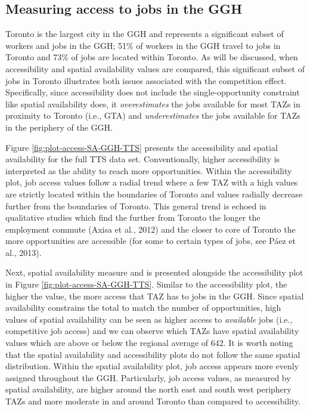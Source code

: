 \documentclass[]{elsarticle} %
\begin{document}
\hypertarget{measuring-access-to-jobs-in-the-ggh}{%
\subsection{Measuring access to jobs in the
GGH}\label{measuring-access-to-jobs-in-the-ggh}}

Toronto is the largest city in the GGH and represents a significant
subset of workers and jobs in the GGH; 51\% of workers in the GGH travel
to jobs in Toronto and 73\% of jobs are located within Toronto. As will
be discussed, when accessibility and spatial availability values are
compared, this significant subset of jobs in Toronto illustrates both
issues associated with the competition effect. Specifically, since
accessibility does not include the single-opportunity constraint like
spatial availability does, it \emph{overestimates} the jobs available
for most TAZs in proximity to Toronto (i.e., GTA) and
\emph{underestimates} the jobs available for TAZs in the periphery of
the GGH.

Figure \ref{fig:plot-access-SA-GGH-TTS} presents the accessibility and
spatial availability for the full TTS data set. Conventionally, higher
accessibility is interpreted as the ability to reach more opportunities.
Within the accessibility plot, job access values follow a radial trend
where a few TAZ with a high values are strictly located within the
boundaries of Toronto and values radially decrease further from the
boundaries of Toronto. This general trend is echoed in qualitative
studies which find the further from Toronto the longer the employment
commute (Axisa et al., 2012) and the closer to core of Toronto the more
opportunities are accessible (for some to certain types of jobs, see
Páez et al., 2013).

Next, spatial availability measure and is presented alongside the
accessibility plot in Figure \ref{fig:plot-access-SA-GGH-TTS}. Similar
to the accessibility plot, the higher the value, the more access that
TAZ has to jobs in the GGH. Since spatial availability constrains the
total to match the number of opportunities, high values of spatial
availability can be seen as higher access to \emph{available} jobs
(i.e., competitive job access) and we can observe which TAZs have
spatial availability values which are above or below the regional
average of 642. It is worth noting that the spatial availability and
accessibility plots do not follow the same spatial distribution. Within
the spatial availability plot, job access appears more evenly assigned
throughout the GGH. Particularly, job access values, as measured by
spatial availability, are higher around the north east and south west
periphery TAZs and more moderate in and around Toronto than compared to
accessibility.
\end{document}
